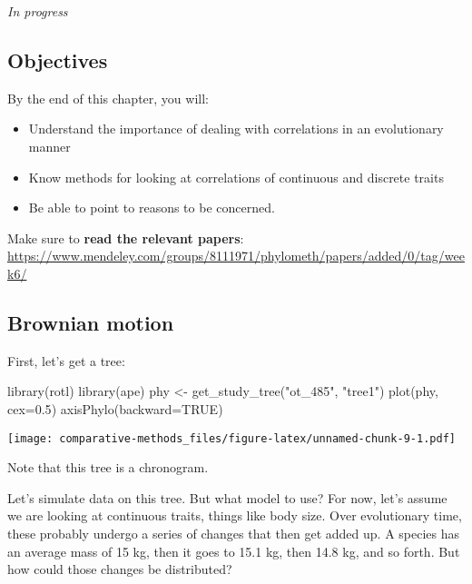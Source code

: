 \documentclass[
]{article}
\newenvironment{Shaded}{\begin{snugshade}}{\end{snugshade}}
\newcommand{\AttributeTok}[1]{\textcolor[rgb]{0.77,0.63,0.00}{#1}}
\newcommand{\ConstantTok}[1]{\textcolor[rgb]{0.00,0.00,0.00}{#1}}
\newcommand{\FloatTok}[1]{\textcolor[rgb]{0.00,0.00,0.81}{#1}}
\newcommand{\FunctionTok}[1]{\textcolor[rgb]{0.00,0.00,0.00}{#1}}
\newcommand{\NormalTok}[1]{#1}
\newcommand{\OtherTok}[1]{\textcolor[rgb]{0.56,0.35,0.01}{#1}}
\newcommand{\StringTok}[1]{\textcolor[rgb]{0.31,0.60,0.02}{#1}}
\providecommand{\tightlist}{%
  \setlength{\itemsep}{0pt}\setlength{\parskip}{0pt}}
\begin{document}
\emph{In progress}

\hypertarget{objectives-3}{%
\subsection{Objectives}\label{objectives-3}}

By the end of this chapter, you will:

\begin{itemize}
\tightlist
\item
  Understand the importance of dealing with correlations in an evolutionary manner
\item
  Know methods for looking at correlations of continuous and discrete traits
\item
  Be able to point to reasons to be concerned.
\end{itemize}

Make sure to \textbf{read the relevant papers}: \url{https://www.mendeley.com/groups/8111971/phylometh/papers/added/0/tag/week6/}

\hypertarget{brownian-motion}{%
\subsection{Brownian motion}\label{brownian-motion}}

First, let's get a tree:

\begin{Shaded}
\begin{Highlighting}[]
\FunctionTok{library}\NormalTok{(rotl)}
\FunctionTok{library}\NormalTok{(ape)}
\NormalTok{phy }\OtherTok{\textless{}{-}} \FunctionTok{get\_study\_tree}\NormalTok{(}\StringTok{"ot\_485"}\NormalTok{, }\StringTok{"tree1"}\NormalTok{)}
\FunctionTok{plot}\NormalTok{(phy, }\AttributeTok{cex=}\FloatTok{0.5}\NormalTok{)}
\FunctionTok{axisPhylo}\NormalTok{(}\AttributeTok{backward=}\ConstantTok{TRUE}\NormalTok{)}
\end{Highlighting}
\end{Shaded}

\texttt{[image: comparative-methods\_files/figure-latex/unnamed-chunk-9-1.pdf]}

Note that this tree is a chronogram.

Let's simulate data on this tree. But what model to use? For now, let's assume we are looking at continuous traits, things like body size. Over evolutionary time, these probably undergo a series of changes that then get added up. A species has an average mass of 15 kg, then it goes to 15.1 kg, then 14.8 kg, and so forth. But how could those changes be distributed?
\end{document}
